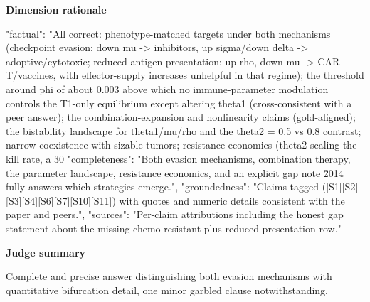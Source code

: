 \documentclass[10pt]{article}
\begin{document}
\textbf{Dimension rationale}
\begin{EvidenceText}
{
  "factual": "All correct: phenotype-matched targets under both mechanisms (checkpoint evasion: down mu -> inhibitors, up sigma/down delta -> adoptive/cytotoxic; reduced antigen presentation: up rho, down mu -> CAR-T/vaccines, with effector-supply increases unhelpful in that regime); the threshold around phi of about 0.003 above which no immune-parameter modulation controls the T1-only equilibrium except altering theta1 (cross-consistent with a peer answer); the combination-expansion and nonlinearity claims (gold-aligned); the bistability landscape for theta1/mu/rho and the theta2 = 0.5 vs 0.8 contrast; narrow coexistence with sizable tumors; resistance economics (theta2 scaling the kill rate, a 30%
  "completeness": "Both evasion mechanisms, combination therapy, the parameter landscape, resistance economics, and an explicit gap note \u2014 fully answers which strategies emerge.",
  "groundedness": "Claims tagged ([S1][S2][S3][S4][S6][S7][S10][S11]) with quotes and numeric details consistent with the paper and peers.",
  "sources": "Per-claim attributions including the honest gap statement about the missing chemo-resistant-plus-reduced-presentation row."
}
\end{EvidenceText}

\textbf{Judge summary}
\begin{EvidenceText}
Complete and precise answer distinguishing both evasion mechanisms with quantitative bifurcation detail, one minor garbled clause notwithstanding.
\end{EvidenceText}
\end{document}
